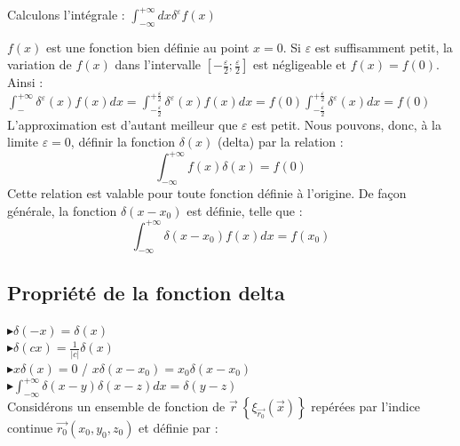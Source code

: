\documentclass[12pt,a4paper,titlepage]{book}
\begin{document}
Calculons l'intégrale : $\int_{- \infty}^{+ \infty} dx \delta^{\varepsilon} f(x)$

$f(x)$ est une fonction bien définie au point $x=0$. Si $\varepsilon$ est suffisamment petit, la variation de $f(x)$ dans l'intervalle $\left[ -\frac{\varepsilon}{2} ; \frac{\varepsilon}{2} \right]$ est négligeable et $f(x) = f(0)$.\\

Ainsi : $\int_{- }^{+ \infty} \delta^{\varepsilon} (x) f(x) dx = \int_{- \frac{\varepsilon}{2}}^{+ \frac{\varepsilon}{2}} \delta^{\varepsilon} (x) f(x) dx = f(0) \int_{- \frac{\varepsilon}{2}}^{+ \frac{\varepsilon}{2}} \delta^{\varepsilon} (x) dx = f(0)$\\

L'approximation est d'autant meilleur que $\varepsilon$ est petit. Nous pouvons, donc, à la limite $\varepsilon = 0$, définir la fonction $\delta (x)$ (delta) par la relation :
\begin{equation*}
\int_{- \infty}^{+ \infty} f(x) \delta (x) = f(0)
\end{equation*}
Cette relation est valable pour toute fonction définie à l'origine. De façon générale, la fonction $\delta (x-x_0)$ est définie, telle que :
\begin{equation*}
\int_{- \infty}^{+ \infty} \delta (x-x_0) f(x) dx = f(x_0)
\end{equation*}

\subsection{Propriété de la fonction delta}

$\blacktriangleright \delta(-x) = \delta (x)$\\

$\blacktriangleright \delta (cx) = \frac{1}{\vert c \vert} \delta (x)$\\

$\blacktriangleright x \delta(x) = 0 $ / $x \delta (x-x_0) = x_0 \delta (x-x_0)$\\

$\blacktriangleright \int_{- \infty}^{+ \infty} \delta (x-y) \delta (x-z) dx = \delta (y-z)$\\

Considérons un ensemble de fonction de $\overrightarrow{r} ~ \left\lbrace \xi_{\overrightarrow{r_0}} (\overrightarrow{x}) \right\rbrace $ repérées par l'indice continue $\overrightarrow{r_0} (x_0 , y_0 , z_0)$ et définie par :
\end{document}
